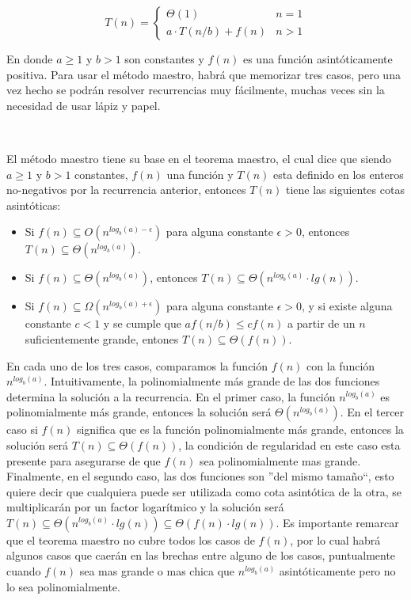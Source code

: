 \documentclass[10pt, a4paper]{report}
\begin{document}
\begin{equation*}
  T(n) = \begin{cases}
	      \Theta(1)         		& n=1 \\
	      a \cdot T(n/b) + f(n)        	& n > 1
	  \end{cases}
\end{equation*}

En donde $a \geq 1$ y $b>1$ son constantes y $f(n)$ es una funci\'on asint\'oticamente positiva. Para usar el m\'etodo maestro, habr\'a que memorizar tres casos, pero una vez hecho se podr\'an resolver recurrencias muy f\'acilmente, muchas veces sin la necesidad de usar l\'apiz y papel. 

~

El m\'etodo maestro tiene su base en el teorema maestro, el cual dice que siendo $a\geq 1$ y $b>1$ constantes, $f(n)$ una funci\'on y $T(n)$ esta definido en los enteros no-negativos por la recurrencia anterior, entonces $T(n)$ tiene las siguientes cotas asint\'oticas:

\begin{itemize}
 \item Si $f(n) \subseteq O(n^{log_b(a)-\epsilon})$ para alguna constante $\epsilon > 0$, entonces $T(n) \subseteq \Theta(n^{log_b(a)})$.
 \item Si $f(n) \subseteq \Theta(n^{log_b(a)})$, entonces $T(n) \subseteq \Theta(n^{log_b(a)} \cdot lg(n))$.
 \item Si $f(n) \subseteq \Omega(n^{log_b(a)+\epsilon})$ para alguna constante $\epsilon > 0$, y si existe alguna constante $c < 1$ y se cumple que $af(n/b) \leq cf(n)$ a partir de un $n$ suficientemente grande, entones $T(n) \subseteq \Theta(f(n))$.
\end{itemize}

En cada uno de los tres casos, comparamos la funci\'on $f(n)$ con la funci\'on $n^{log_b(a)}$. Intuitivamente, la polinomialmente m\'as grande de las dos funciones determina la soluci\'on a la recurrencia. En el primer caso, la funci\'on $n^{log_b(a)}$ es polinomialmente m\'as grande, entonces la soluci\'on ser\'a $\Theta(n^{log_b(a)})$. En el tercer caso si $f(n)$ significa que es la funci\'on polinomialmente m\'as grande, entonces la soluci\'on ser\'a $T(n) \subseteq \Theta(f(n))$, la condici\'on de regularidad en este caso esta presente para asegurarse de que $f(n)$ sea polinomialmente mas grande. Finalmente, en el segundo caso, las dos funciones son ''del mismo tama\~no``, esto quiere decir que cualquiera puede ser utilizada como cota asint\'otica de la otra, se multiplicar\'an por un factor logar\'itmico y la soluci\'on ser\'a $T(n) \subseteq \Theta(n^{log_b(a)} \cdot lg(n)) \subseteq \Theta(f(n) \cdot lg(n))$. Es importante remarcar que el teorema maestro no cubre todos los casos de $f(n)$, por lo cual 
habr\'a algunos casos que caer\'an en las brechas entre alguno de los casos, puntualmente cuando $f(n)$ sea mas grande o mas chica que $n^{log_b(a)}$ asint\'oticamente pero no lo sea polinomialmente.
\end{document}
